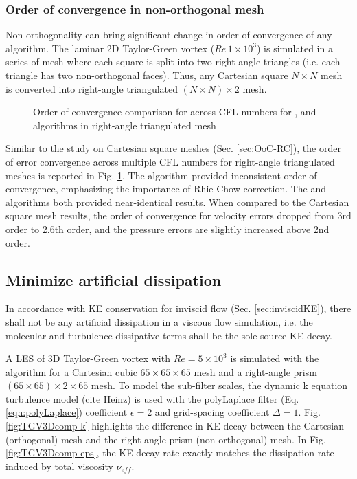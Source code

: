 \subsubsection{Order of convergence in non-orthogonal mesh}
Non-orthogonality can bring significant change in order of convergence of any algorithm. The laminar 2D Taylor-Green vortex ($Re\, 1\times10^3$) is simulated in a series of mesh where each square is split into two right-angle triangles (i.e. each triangle has two non-orthogonal faces). Thus, any Cartesian square $N \times N$ mesh is converted into right-angle triangulated $(N \times N) \times 2$ mesh.

\begin{figure}[!h]
\centering
{}
\caption{Order of convergence comparison for across CFL numbers for \spaece, \spaeceRC and \piso algorithms in right-angle triangulated mesh} 
\label{fig:TGV2D-RAT1000-CFL}
\end{figure}

Similar to the study on Cartesian square meshes (Sec. \ref{sec:OoC-RC}), the order of error convergence across multiple CFL numbers for right-angle triangulated meshes is reported in Fig. \ref{fig:TGV2D-RAT1000-CFL}. The \spaece algorithm provided inconsistent order of convergence, emphasizing the importance of Rhie-Chow correction. The \spaeceRC and \piso algorithms both provided near-identical results. When compared to the Cartesian square mesh results, the order of convergence for velocity errors dropped from 3rd order to 2.6th order, and the pressure errors are slightly increased above 2nd order. 

\subsection{Minimize artificial dissipation}
\label{sec:minimizeArtificialDissipation}
In accordance with KE conservation for inviscid flow (Sec. \ref{sec:inviscidKE}), there shall not be any artificial dissipation in a viscous flow simulation, i.e. the molecular and turbulence dissipative terms shall be the sole source KE decay. 

A LES of 3D Taylor-Green vortex with $Re = 5\times10^3$ is simulated with the \spaece algorithm for a Cartesian cubic $65 \times 65 \times 65$ mesh and a right-angle prism $(65 \times 65) \times 2 \times 65$ mesh. To model the sub-filter scales, the dynamic k equation turbulence model (cite Heinz) is used with the polyLaplace filter (Eq. \eqref{eqn:polyLaplace}) coefficient $\epsilon = 2$ and grid-spacing coefficient $\Delta =1$. Fig. \ref{fig:TGV3Dcomp-k} highlights the difference in KE decay between the Cartesian (orthogonal) mesh and the right-angle prism (non-orthogonal) mesh. In Fig. \ref{fig:TGV3Dcomp-eps}, the KE decay rate exactly matches the dissipation rate induced by total viscosity $\nu_{eff}$. 

